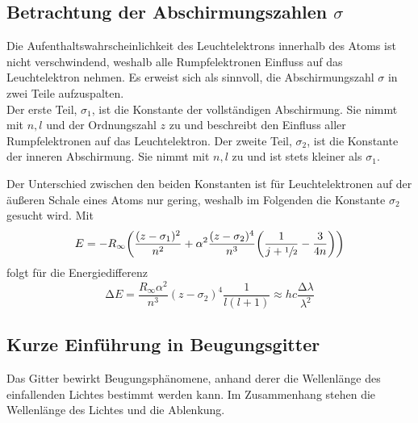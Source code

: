 \subsection{Betrachtung der Abschirmungszahlen \texorpdfstring{$\sigma$}{Sigma}}
Die Aufenthaltswahrscheinlichkeit des Leuchtelektrons innerhalb des Atoms ist nicht verschwindend, weshalb alle Rumpfelektronen Einfluss auf das Leuchtelektron nehmen.
Es erweist sich als sinnvoll, die Abschirmungszahl $\sigma$ in zwei Teile aufzuspalten.\\
Der erste Teil, $\sigma_1$, ist die Konstante der vollständigen Abschirmung. 
Sie nimmt mit $n,l$ und der Ordnungszahl $z$ zu und beschreibt den Einfluss aller Rumpfelektronen auf das Leuchtelektron.
Der zweite Teil, $\sigma_2$, ist die Konstante der inneren Abschirmung. 
Sie nimmt mit $n,l$ zu und ist stets kleiner als $\sigma_1$.

Der Unterschied zwischen den beiden Konstanten ist für Leuchtelektronen auf der äußeren Schale eines Atoms nur gering, weshalb im Folgenden die Konstante $\sigma_2$ gesucht wird.
Mit
\begin{equation}
	E=-R_\infty\biggl(\frac{(z-\sigma_1)^2}{n^2}+\alpha^2\frac{(z-\sigma_2)^4}{n^3}\biggl(\frac{1}{j+\sfrac{1}{2}}-\frac{3}{4n}\biggr) \biggr)
\end{equation}
folgt für die Energiedifferenz
\begin{equation}
	\mathup{\Delta}E=\frac{R_\infty\alpha^2}{n^3}(z-\sigma_2)^4\frac{1}{l(l+1)}\approx hc\frac{\mathup{\Delta}\lambda}{\lambda^2}
\end{equation}

\subsection{Kurze Einführung in Beugungsgitter}
Das Gitter bewirkt Beugungsphänomene, anhand derer die Wellenlänge des einfallenden Lichtes bestimmt werden kann.
Im Zusammenhang stehen die Wellenlänge des Lichtes und die Ablenkung.

